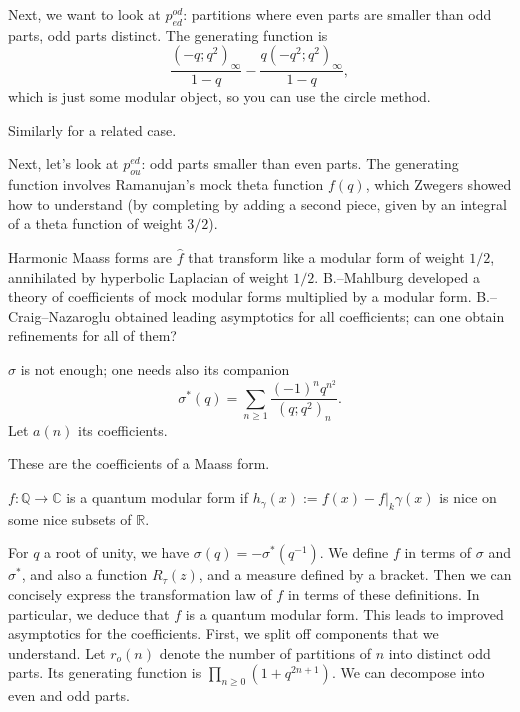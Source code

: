 \documentclass[reqno]{amsart} 
\begin{document}
Next, we want to look at $p_{e d}^{o d}$: partitions where even parts are smaller than odd parts, odd parts distinct.  The generating function is
\begin{equation*}
  \frac{(- q; q^2)_\infty}{ 1 - q}
  - \frac{q(- q^2 ; q^2)_\infty}{1 - q},
\end{equation*}
which is just some modular object, so you can use the circle method.

Similarly for a related case.

Next, let's look at $p_{o u}^{e d}$: odd parts smaller than even parts.  The generating function involves Ramanujan's mock theta function $f(q)$, which Zwegers showed how to understand (by completing by adding a second piece, given by an integral of a theta function of weight $3 /2$).

Harmonic Maass forms are $\hat{f}$ that transform like a modular form of weight $1/2$, annihilated by hyperbolic Laplacian of weight $1/2$.  B.--Mahlburg developed a theory of coefficients of mock modular forms multiplied by a modular form.  B.--Craig--Nazaroglu obtained leading asymptotics for all coefficients; can one obtain refinements for all of them?

$\sigma$ is not enough; one needs also its companion
\begin{equation*}
  \sigma^\ast(q) = \sum_{n \geq 1}
  \frac{(- 1)^n q^{n^2}}{(q; q^2)_n}.
\end{equation*}
Let $a(n)$ its coefficients.
\begin{theorem}[Cohen]
  These are the coefficients of a Maass form.
\end{theorem}

\begin{definition}[Zagier]
  $f : \mathbb{Q} \rightarrow \mathbb{C}$ is a quantum modular form if $h_\gamma(x) := f(x) - f|_k \gamma(x)$ is nice on some nice subsets of $\mathbb{R}$.
\end{definition}

For $q$ a root of unity, we have $\sigma(q) = - \sigma^\ast(q^{-1})$.  We define $f$ in terms of $\sigma$ and $\sigma^\ast$, and also a function $R_\tau(z)$, and a measure defined by a bracket.  Then we can concisely express the transformation law of $f$ in terms of these definitions.  In particular, we deduce that $f$ is a quantum modular form.  This leads to improved asymptotics for the coefficients.  First, we split off components that we understand.  Let $r_o(n)$ denote the number of partitions of $n$ into distinct odd parts.  Its generating function is $\prod_{n \geq 0}(1 + q^{2 n + 1})$.  We can decompose into even and odd parts.
\end{document}
